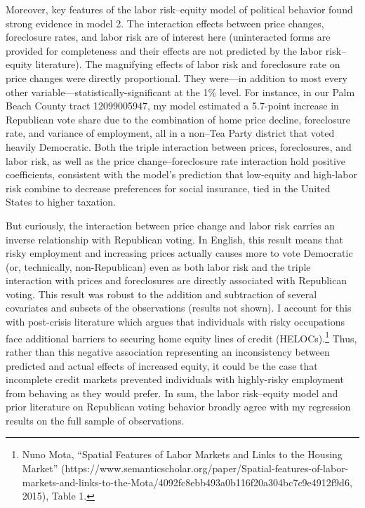\documentclass[12pt,oneside]{psthesis}
\begin{document}
Moreover, key features of the labor risk--equity model of political behavior found strong evidence in model 2.
The interaction effects between price changes, foreclosure rates, and labor risk are of interest here (uninteracted forms are provided for completeness and their effects are not predicted by the labor risk--equity literature).
The magnifying effects of labor risk and foreclosure rate on price changes were directly proportional.
They were---in addition to most every other variable---statistically-significant at the 1\% level.
For instance, in our Palm Beach County tract 12099005947, my model estimated a 5.7-point increase in Republican vote share due to the combination of home price decline, foreclosure rate, and variance of employment, all in a non--Tea Party district that voted heavily Democratic.
Both the triple interaction between prices, foreclosures, and labor risk, as well as the price change--foreclosure rate interaction hold positive coefficients, consistent with the model's prediction that low-equity and high-labor risk combine to decrease preferences for social insurance, tied in the United States to higher taxation.

But curiously, the interaction between price change and labor risk carries an inverse relationship with Republican voting.
In English, this result means that risky employment and increasing prices actually causes more to vote Democratic (or, technically, non-Republican) even as both labor risk and the triple interaction with prices and foreclosures are directly associated with Republican voting.
This result was robust to the addition and subtraction of several covariates and subsets of the observations (results not shown).
I account for this with post-crisis literature which argues that individuals with risky occupations face additional barriers to securing home equity lines of credit (HELOCs).\footnote{Nuno Mota, ``Spatial Features of Labor Markets and Links to the Housing Market'' (https://www.semanticscholar.org/paper/Spatial-features-of-labor-markets-and-links-to-the-Mota/4092fc8ebb493a0b116f20a304bc7c9e4912f9d6, 2015), Table 1.}
Thus, rather than this negative association representing an inconsistency between predicted and actual effects of increased equity, it could be the case that incomplete credit markets prevented individuals with highly-risky employment from behaving as they would prefer.
In sum, the labor risk--equity model and prior literature on Republican voting behavior broadly agree with my regression results on the full sample of observations.
\end{document}
